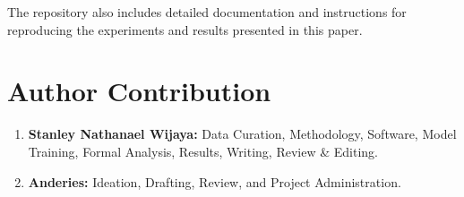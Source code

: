 \documentclass[conference]{IEEEtran}
\begin{document}
The repository also includes detailed documentation and instructions for reproducing the experiments and results presented in this paper.

\section*{Author Contribution}
\begin{enumerate}
    \item \textbf{Stanley Nathanael Wijaya:} Data Curation, Methodology, Software, Model Training, Formal Analysis, Results, Writing, Review \& Editing.
    \item \textbf{Anderies:} Ideation, Drafting, Review, and Project Administration.
\end{enumerate}



\end{document}
